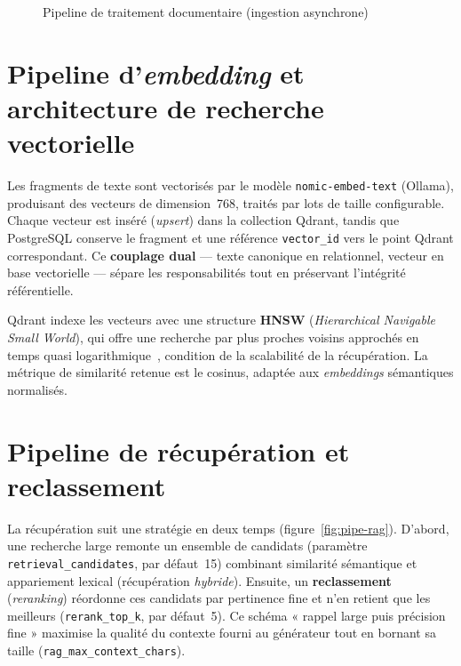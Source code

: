 \documentclass[12pt,a4paper,oneside]{report}
\newcommand{\code}[1]{\texttt{\small #1}}
\begin{document}
\begin{figure}[H]
\centering
{}
\caption{Pipeline de traitement documentaire (ingestion asynchrone)}
\label{fig:pipe-doc}
\end{figure}

\section{Pipeline d'\emph{embedding} et architecture de recherche vectorielle}
Les fragments de texte sont vectorisés par le modèle \code{nomic-embed-text}
(Ollama), produisant des vecteurs de dimension~768, traités par lots de taille
configurable. Chaque vecteur est inséré (\emph{upsert}) dans la collection Qdrant,
tandis que PostgreSQL conserve le fragment et une référence \code{vector\_id} vers
le point Qdrant correspondant. Ce \textbf{couplage dual} — texte canonique en
relationnel, vecteur en base vectorielle — sépare les responsabilités tout en
préservant l'intégrité référentielle.

Qdrant indexe les vecteurs avec une structure \textbf{HNSW} (\emph{Hierarchical
Navigable Small World}), qui offre une recherche par plus proches voisins
approchés en temps quasi logarithmique~\cite{malkov2018hnsw}, condition de la
scalabilité de la récupération. La métrique de similarité retenue est le cosinus,
adaptée aux \emph{embeddings} sémantiques normalisés.

\section{Pipeline de récupération et reclassement}
La récupération suit une stratégie en deux temps (figure~\ref{fig:pipe-rag}).
D'abord, une recherche large remonte un ensemble de candidats (paramètre
\code{retrieval\_candidates}, par défaut~15) combinant similarité sémantique et
appariement lexical (récupération \emph{hybride}). Ensuite, un
\textbf{reclassement} (\emph{reranking}) réordonne ces candidats par pertinence
fine et n'en retient que les meilleurs (\code{rerank\_top\_k}, par défaut~5). Ce
schéma « rappel large puis précision fine » maximise la qualité du contexte fourni
au générateur tout en bornant sa taille (\code{rag\_max\_context\_chars}).
\end{document}
